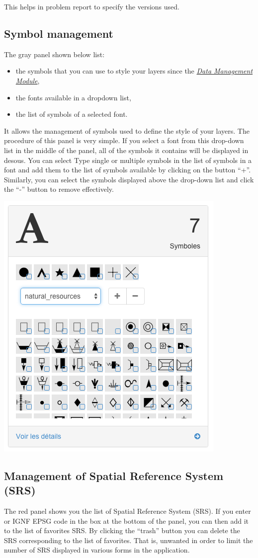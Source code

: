 \documentclass[letterpaper,10pt,english]{sphinxmanual}
\begin{document}
This helps in problem report to specify the versions used.


\subsection{Symbol management}
\label{dashboard/overview:gestion-des-symboles}
The gray panel shown below list:
\begin{itemize}
\item {} 
the symbols that you can use to style your layers since the {\hyperref[data/index::doc]{\emph{\emph{Data Management Module}}}},

\item {} 
the fonts available in a dropdown list,

\item {} 
the list of symbols of a selected font.

\end{itemize}

It allows the management of symbols used to define the style of your layers. The procedure of this panel is very simple. If you select a font from this drop-down list in the middle of the panel, all of the symbols it contains will be displayed in desous. You can select Type single or multiple symbols in the list of symbols in a font and add them to the list of symbols available by clicking on the button ``+''. Similarly, you can select the symbols displayed above the drop-down list and click the ``-'' button to remove effectively.

\includegraphics[width=0.330\linewidth]{dashboard-symbols-block.png}


\subsection{Management of Spatial Reference System (SRS)}
\label{dashboard/overview:gestion-des-systemes-de-references-spatiales-srs}
The red panel shows you the list of Spatial Reference System (SRS). If you enter or IGNF EPSG code in the box at the bottom of the panel, you can then add it to the list of favorites SRS. By clicking the ``trash'' button you can delete the SRS corresponding to the list of favorites. That is, unwanted in order to limit the number of SRS displayed in various forms in the application.
\end{document}
